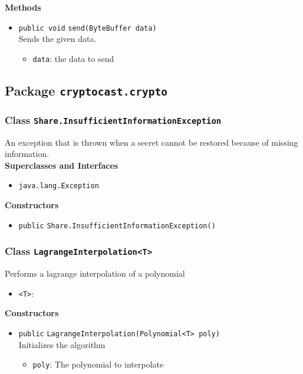 \textbf{Methods}
\begin{itemize}
\item \lstinline|public void| \lstinline|send|\lstinline|(ByteBuffer data)|\\
Sends the given data.
\begin{itemize}
\item \lstinline|data|: the data to send
\end{itemize}



\end{itemize}


\subsection{Package \lstinline!cryptocast.crypto!}
\subsubsection{Class \lstinline|Share.InsufficientInformationException|}
An exception that is thrown when a secret cannot be restored because
 of missing information. \\


\textbf{Superclasses and Interfaces}
\begin{itemize}
\item \lstinline|java.lang.Exception|
\end{itemize}



\textbf{Constructors}
\begin{itemize}
\item \lstinline|public| \lstinline|Share.InsufficientInformationException|\lstinline|()|




\end{itemize}


\subsubsection{Class \lstinline|LagrangeInterpolation<T>|}
Performs a lagrange interpolation of a polynomial \\


\begin{itemize}
\item \lstinline|<T>|: 
\end{itemize}


\textbf{Constructors}
\begin{itemize}
\item \lstinline|public| \lstinline|LagrangeInterpolation|\lstinline|(Polynomial<T> poly)|\\
Initializes the algorithm
\begin{itemize}
\item \lstinline|poly|: The polynomial to interpolate
\end{itemize}



\end{itemize}



